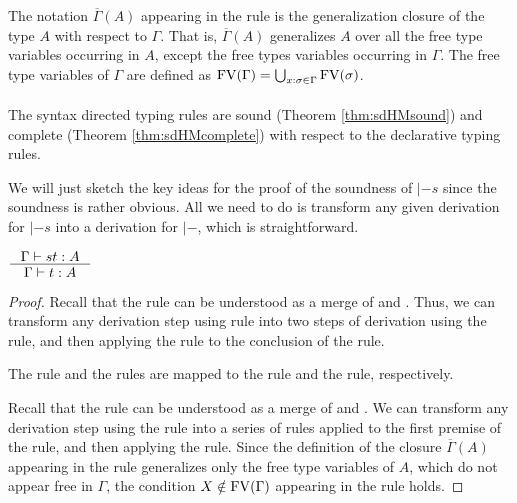 The notation $\overline{\Gamma}(A)$ appearing in the rule  is
the generalization closure of the type $A$ with respect to $\Gamma$. 
That is, $\overline{\Gamma}(A)$
generalizes $A$ over all the free type variables occurring in $A$, except the free types
variables occurring in $\Gamma$. The free type variables of $\Gamma$ are defined as
$\mathop{\mathrm{FV}}(\Gamma) = \bigcup_{x:\sigma\in \Gamma} \mathop{\mathrm{FV}}(\sigma)$.

\paragraph{}
The syntax directed typing rules are sound (Theorem \ref{thm:sdHMsound})
and complete (Theorem \ref{thm:sdHMcomplete}) with respect to
the declarative typing rules.

We will just sketch the key ideas for the proof of the soundness of $|-s$
since the soundness is rather obvious. All we need to do is transform
any given derivation for $|-s$ into a derivation for $|-$, which is
straightforward.
\begin{theorem}
$ \inference{\Gamma |-s t : A}{\Gamma |- t : A} $
\label{thm:sdHMsound}
\end{theorem}
\begin{proof}
Recall that the  rule can be understood as a merge of
 and . Thus, we can transform any derivation
step using  rule into two steps of derivation using
the  rule, and then applying the  rule
to the conclusion of the  rule.

The  rule and the  rules are mapped
to the  rule and the  rule, respectively.

Recall that the  rule can be understood as a merge of
 and . We can transform any derivation step
using the  rule into a series of  rules
applied to the first premise of the  rule, and then applying
the  rule. Since the definition of the closure
$\overline{\Gamma}(A)$ appearing in the  rule
generalizes only the free type variables of $A$, which do not
appear free in $\Gamma$, the condition $X\notin\mathop{\mathrm{FV}}(\Gamma)$ appearing
in the  rule holds.
\end{proof}

